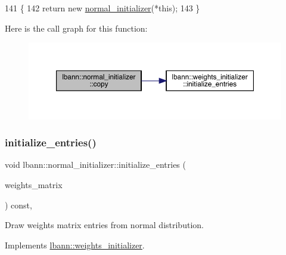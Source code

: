 \begin{DoxyCode}
141                                             \{
142     \textcolor{keywordflow}{return} \textcolor{keyword}{new} \hyperlink{classlbann_1_1normal__initializer_a6db5f5aeedb4a314d36bc3106bda6b56}{normal\_initializer}(*\textcolor{keyword}{this});
143   \}
\end{DoxyCode}
Here is the call graph for this function\+:\nopagebreak
\begin{figure}[H]
\begin{center}
\leavevmode
\includegraphics[width=350pt]{classlbann_1_1normal__initializer_a154369b8513c5cf0edf201f1e8cc0887_cgraph}
\end{center}
\end{figure}
\mbox{\label{classlbann_1_1normal__initializer_a3958aa3e88af76077cc7559eba0a5a17}} 
\subsubsection{\texorpdfstring{initialize\+\_\+entries()}{initialize\_entries()}}
{\footnotesize\ttfamily void lbann\+::normal\+\_\+initializer\+::initialize\+\_\+entries (\begin{DoxyParamCaption}\item[{\hyperlink{base_8hpp_a9a697a504ae84010e7439ffec862b470}{Abs\+Dist\+Mat} \&}]{weights\+\_\+matrix }\end{DoxyParamCaption}) const\hspace{0.3cm}{\ttfamily [override]}, {\ttfamily [virtual]}}

Draw weights matrix entries from normal distribution. 

Implements \hyperlink{classlbann_1_1weights__initializer_a2ad6acf904c0c7bc7406dbd9851107be}{lbann\+::weights\+\_\+initializer}.



